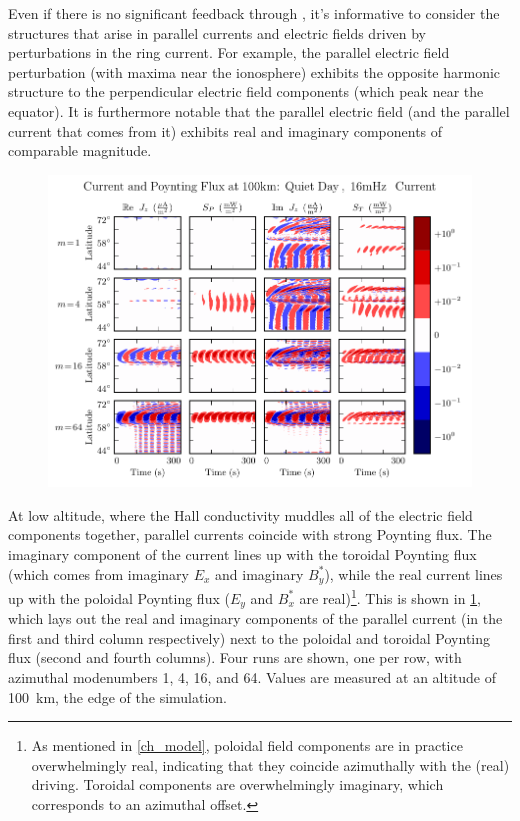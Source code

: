 Even if there is no significant feedback through \farlaw, it's informative to consider the structures that arise in parallel currents and electric fields driven by perturbations in the ring current. For example, the parallel electric field perturbation (with maxima near the ionosphere) exhibits the opposite harmonic structure to the perpendicular electric field components (which peak near the equator). It is furthermore notable that the parallel electric field (and the parallel current that comes from it) exhibits real and imaginary components of comparable magnitude. 


\begin{figure}[!htb]
    \centering
    \includegraphics[width=\textwidth]{figures/slice_100km.pdf}
    \caption[Current and Poynting Flux at \SI{100}{\km}]{
      \todo{$\cdots$}
    }
    \label{fig_slice_100km}
\end{figure}

At low altitude, where the Hall conductivity muddles all of the electric field components together, parallel currents coincide with strong Poynting flux. The imaginary component of the current lines up with the toroidal Poynting flux (which comes from imaginary $E_x$ and imaginary $B_y^*$), while the real current lines up with the poloidal Poynting flux ($E_y$ and $B_x^*$ are real)\footnote{As mentioned in \cref{ch_model}, poloidal field components are in practice overwhelmingly real, indicating that they coincide azimuthally with the (real) driving. Toroidal components are overwhelmingly imaginary, which corresponds to an azimuthal offset. }. This is shown in \cref{fig_slice_100km}, which lays out the real and imaginary components of the parallel current (in the first and third column respectively) next to the poloidal and toroidal Poynting flux (second and fourth columns). Four runs are shown, one per row, with azimuthal modenumbers 1, 4, 16, and 64. Values are measured at an altitude of \SI{100}{\km}, the edge of the simulation. 

